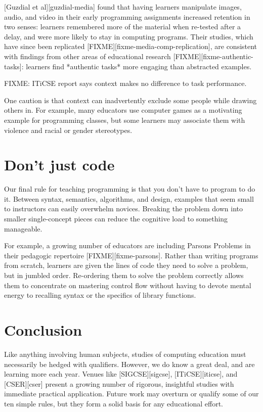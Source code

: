 \documentclass{article}
\begin{document}
[Guzdial et al][guzdial-media] found that having learners manipulate images, audio, and video
in their early programming assignments
increased retention in two senses:
learners remembered more of the material when re-tested after a delay,
and were more likely to stay in computing programs.
Their studies,
which have since been replicated [FIXME][fixme-media-comp-replication],
are consistent with findings from other areas of educational research [FIXME][fixme-authentic-tasks]:
learners find *authentic tasks* more engaging than abstracted examples.

FIXME: ITiCSE report says context makes no difference to task performance.

One caution is that context can inadvertently exclude some people while drawing others in.
For example,
many educators use computer games as a motivating example for programming classes,
but some learners may associate them with violence and racial or gender stereotypes.

\section{Don't just code}

Our final rule for teaching programming is that you don't have to program to do it.
Between syntax, semantics, algorithms, and design,
examples that seem small to instructors can easily overwhelm novices.
Breaking the problem down into smaller single-concept pieces can reduce the cognitive load to something manageable.

For example,
a growing number of educators are including Parsons Problems in their pedagogic repertoire [FIXME][fixme-parsons].
Rather than writing programs from scratch,
learners are given the lines of code they need to solve a problem,
but in jumbled order.
Re-ordering them to solve the problem correctly allows them to concentrate on mastering control flow
without having to devote mental energy to recalling syntax
or the specifics of library functions.

\section*{Conclusion}

Like anything involving human subjects,
studies of computing education must necessarily be hedged with qualifiers.
However,
we do know a great deal,
and are learning more each year.
Venues like [SIGCSE][sigcse],
[ITiCSE][iticse],
and [CSER][cser]
present a growing number of rigorous, insightful studies
with immediate practical application.
Future work may overturn or qualify some of our ten simple rules,
but they form a solid basis for any educational effort.
\end{document}
